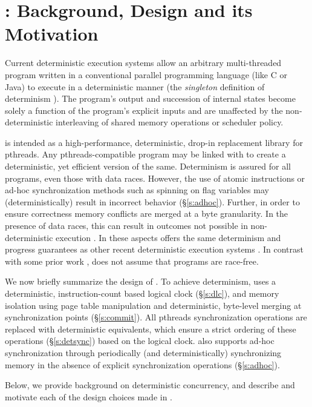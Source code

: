\section{\Lib{}: Background, Design and its Motivation}
\label{s:perf}

Current deterministic execution systems \cite{liu_dthreads:_2011,merrifield_conversion:_2013,kai_lu_efficient_2014} allow an arbitrary multi-threaded program written in a conventional parallel programming language (like C or Java) to execute in a deterministic manner (the \emph{singleton} definition of determinism \cite{Lu:2011:DISC}). The program's output and succession of internal states become solely a function of the program's explicit inputs 
and are unaffected by the non-deterministic interleaving of shared memory operations or scheduler policy.

\lib{} is intended as a high-performance, deterministic, drop-in replacement library for pthreads. Any pthreads-compatible program may be linked with \lib{} to create a deterministic, yet efficient version of the same. Determinism is assured for all programs, even those with data races. However, the use of atomic instructions or ad-hoc synchronization methods such as spinning on flag variables may (deterministically) result in incorrect behavior (\S\ref{s:adhoc}). Further, in order to ensure correctness memory conflicts are merged at a byte granularity. In the presence of data races, this can result in outcomes not possible in non-deterministic execution \cite{kai_lu_efficient_2014}. In these aspects \lib{} offers the same determinism and progress guarantees as other recent deterministic execution systems \cite{liu_dthreads:_2011,kai_lu_efficient_2014}. In contrast with some prior work \cite{olszewski_kendo:_2009}, \lib{} does not assume that programs are race-free.

We now briefly summarize the design of \lib{}.
To achieve determinism, \lib{} uses a deterministic, instruction-count based logical clock (\S\ref{s:dlc}), and memory isolation using page table manipulation and deterministic, byte-level merging at synchronization points (\S\ref{s:commit}). All pthreads synchronization operations are replaced with deterministic equivalents, which ensure a strict ordering of these operations (\S\ref{s:detsync}) based on the logical clock. \lib{} also supports ad-hoc synchronization through periodically (and deterministically) synchronizing memory in the absence of explicit synchronization operations (\S\ref{s:adhoc}). 

Below, we provide background on deterministic concurrency, and describe and motivate each of the design choices made in \lib{}.

